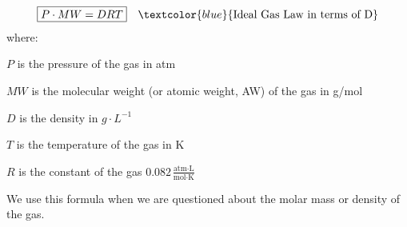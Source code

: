 \documentclass[main.tex]{subfiles}
\begin{document}
\begin{description}
\begin{equation*}\begin{split}
\boxed{  P\cdot MW=DRT} \quad \textcolor{blue}{\text{Ideal Gas Law in terms of D}}
\end{split}\end{equation*}
where:
\begin{where}
 \item $P$   is the pressure of the gas in atm
\item $MW$ is the molecular weight (or atomic weight, AW) of the gas in g/mol 
 \item $D$   is the density in $g\cdot L^{-1}$
\item $T$   is the temperature of the gas in K
\item $R$   is the constant of the gas $0.082\frac{\text{atm}\cdot \text{L}}{\text{mol}\cdot \text{K}}$
\end{where}
We use this formula when we are questioned about the molar mass or density of the gas.


\end{description}
\end{document}
